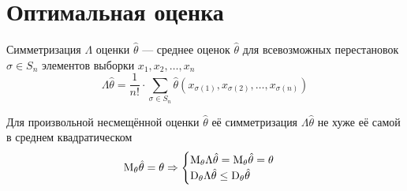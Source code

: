 \section{Оптимальная оценка}
\begin{definition}[Симметризация]
    Симметризация $\Lambda$ оценки $\hat{\theta}$ --- среднее
    оценок $\hat{\theta}$ для
    всевозможных перестановок $\sigma\in S_n$
    элементов выборки $x_1, x_2, \dots, x_n$
    $$\Lambda\hat{\theta}
        =\frac{1}{n!}\cdot\sum_{\sigma\in S_n} \hat{\theta}\left(
            x_{\sigma\left(1\right)}, x_{\sigma\left(2\right)},
                \dots, x_{\sigma\left(n\right)}\right)$$
\end{definition}
\begin{lemma}
    Для произвольной несмещённой оценки $\hat{\theta}$
    её симметризация $\Lambda{\hat{\theta}}$
    не хуже её самой в среднем квадратическом
    \begin{align*}
    \mathrm{M}_{\theta} \hat{\theta}
        =\theta
    \Rightarrow
        \begin{cases}
            \mathrm{M}_{\theta} \Lambda{\hat{\theta}}
                =\mathrm{M}_{\theta} \hat{\theta}
                =\theta\\
            \mathrm{D}_{\theta} \Lambda{\hat{\theta}}
                \le\mathrm{D}_{\theta} \hat{\theta}
        \end{cases}
    \end{align*}
\end{lemma}
